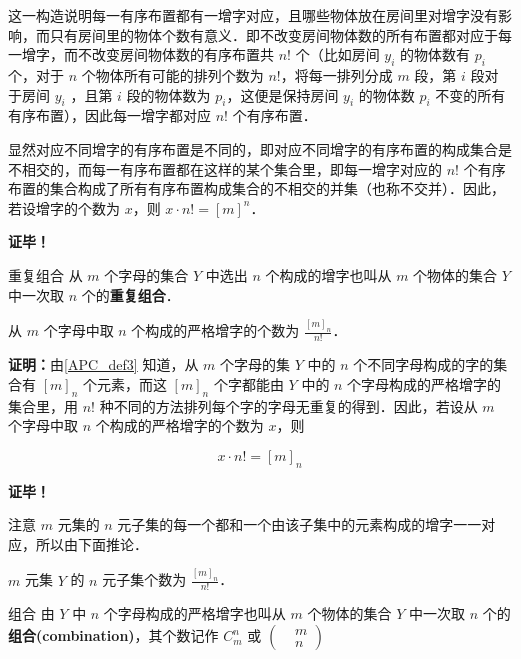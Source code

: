 这一构造说明每一有序布置都有一增字对应，且哪些物体放在房间里对增字没有影响，而只有房间里的物体个数有意义．即不改变房间物体数的所有布置都对应于每一增字，而不改变房间物体数的有序布置共 $n!$ 个（比如房间 $y_i$ 的物体数有 $p_i$ 个，对于 $n$ 个物体所有可能的排列个数为 $n!$，将每一排列分成 $m$ 段，第 $i$ 段对于房间 $y_i$ ，且第 $i$ 段的物体数为 $p_i$，这便是保持房间 $y_i$ 的物体数 $p_i$ 不变的所有有序布置），因此每一增字都对应 $n!$ 个有序布置．

显然对应不同增字的有序布置是不同的，即对应不同增字的有序布置的构成集合是不相交的，而每一有序布置都在这样的某个集合里，即每一增字对应的 $n!$ 个有序布置的集合构成了所有有序布置构成集合的不相交的并集（也称不交并）．因此，若设增字的个数为 $x$，则 $x\cdot n!=[m]^n$．

\textbf{证毕！}

\begin{definition}{重复组合}
从 $m$ 个字母的集合 $Y$ 中选出 $n$ 个构成的增字也叫从 $m$ 个物体的集合 $Y$ 中一次取 $n$ 个的\textbf{重复组合}．
\end{definition}

\begin{theorem}{}\label{APC_the3}
从 $m$ 个字母中取 $n$ 个构成的严格增字的个数为 $\frac{[m]_n}{n!}$．
\end{theorem}
\textbf{证明：}由\autoref{APC_def3} 知道，从 $m$ 个字母的集 $Y$ 中的 $n$ 个不同字母构成的字的集合有 $[m]_n$ 个元素，而这 $[m]_n$ 个字都能由 $Y$ 中的 $n$ 个字母构成的严格增字的集合里，用 $n!$ 种不同的方法排列每个字的字母无重复的得到．因此，若设从 $m$ 个字母中取 $n$ 个构成的严格增字的个数为 $x$，则

\begin{equation}
x\cdot n!=[m]_n
\end{equation}

\textbf{证毕！}

注意 $m$ 元集的 $n$ 元子集的每一个都和一个由该子集中的元素构成的增字一一对应，所以由下面推论．
\begin{corollary}{}
$m$ 元集 $Y$ 的 $n$ 元子集个数为 $\frac{[m]_n}{n!}$．
\end{corollary}

\begin{definition}{组合}
由 $Y$ 中 $n$ 个字母构成的严格增字也叫从 $m$ 个物体的集合 $Y$ 中一次取 $n$ 个的\textbf{组合(combination)}，其个数记作 $C_m^n$ 或 $\left(\begin{aligned}&m\\&n\end{aligned}\right)$
\end{definition}
